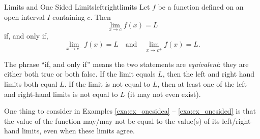 \begin{theorem}{Limits and One Sided Limits}{leftrightlimits}
{Let $f$ be a function defined on an open interval $I$ containing $c$.  Then $$\lim_{x\to c}f(x) = L$$ if, and only if, $$\lim_{x\to c^-}f(x) = L \quad \text{and} \quad \lim_{x\to c^+}f(x) = L.$$}
\end{theorem}

The phrase ``if, and only if'' means the two statements are \textit{equivalent}: they are either both true or both false. If the limit equals $L$, then the left and right hand limits both equal $L$. If the limit is not equal to $L$, then at least one of the left and right-hand limits is not equal to $L$ (it may not even exist).
			
One thing to consider in Examples \ref{exa:ex_onesidea} -- \ref{exa:ex_onesided} is that the value of the function may/may not be equal to the value(s) of its left/right-hand limits, even when these limits agree. \\


